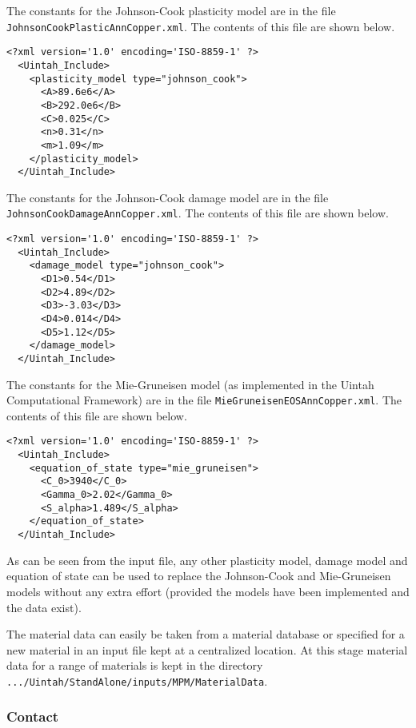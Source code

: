   The constants for the Johnson-Cook plasticity model are in the file
  \verb+JohnsonCookPlasticAnnCopper.xml+.  The contents of this file are
  shown below.
  \begin{Verbatim}[fontsize=\footnotesize]
  <?xml version='1.0' encoding='ISO-8859-1' ?>
  <Uintah_Include>
    <plasticity_model type="johnson_cook">
      <A>89.6e6</A>
      <B>292.0e6</B>
      <C>0.025</C>
      <n>0.31</n>
      <m>1.09</m>
    </plasticity_model>
  </Uintah_Include>
  \end{Verbatim}

  The constants for the Johnson-Cook damage model are in the file
  \verb+JohnsonCookDamageAnnCopper.xml+.  The contents of this file are
  shown below.
  \begin{Verbatim}[fontsize=\footnotesize]
  <?xml version='1.0' encoding='ISO-8859-1' ?>
  <Uintah_Include>
    <damage_model type="johnson_cook">
      <D1>0.54</D1>
      <D2>4.89</D2>
      <D3>-3.03</D3>
      <D4>0.014</D4>
      <D5>1.12</D5>
    </damage_model>
  </Uintah_Include>
  \end{Verbatim}

  The constants for the Mie-Gruneisen model (as implemented in the
  Uintah Computational Framework) are in the file
  \verb+MieGruneisenEOSAnnCopper.xml+.  The contents of this file are
  shown below.
  \begin{Verbatim}[fontsize=\footnotesize]
  <?xml version='1.0' encoding='ISO-8859-1' ?>
  <Uintah_Include>
    <equation_of_state type="mie_gruneisen">
      <C_0>3940</C_0>
      <Gamma_0>2.02</Gamma_0>
      <S_alpha>1.489</S_alpha>
    </equation_of_state>
  </Uintah_Include>
  \end{Verbatim}

  As can be seen from the input file, any other plasticity model, damage
  model and equation of state can be used to replace the Johnson-Cook
  and Mie-Gruneisen models without any extra effort (provided the models
  have been implemented and the data exist).

  The material data can easily be taken from a material database or specified
  for a new material in an input file kept at a centralized location.  At this
  stage material data for a range of materials is kept in the directory
  \verb|.../Uintah/StandAlone/inputs/MPM/MaterialData|.



\subsubsection{Contact}  \label{Sec:Contact}

